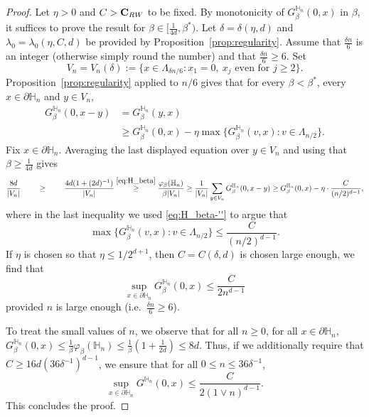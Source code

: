 \documentclass[11pt,a4paper]{article}
\numberwithin{equation}{section}
\theoremstyle{plain}
\theoremstyle{definition}
\newcommand\bfC{\mathbf{C}}
\begin{document}
\begin{proof} Let $\eta>0$ and $C>\bfC_{\rm RW}$ to be fixed. By monotonicity of $G_{\beta}^{\mathbb H_n}(0,x)$ in $\beta$, it suffices to prove the result for $\beta\in [\tfrac{1}{4d},\beta^*)$. Let $\delta=\delta(\eta,d)$ and $\lambda_0=\lambda_0(\eta,C,d)$ be provided by Proposition~\ref{prop:regularity}. Assume that $\tfrac{\delta n}{6}$ is an integer (otherwise simply round the number) and that $\tfrac{\delta n}{6}\geq 6$. Set \begin{equation}
V_n=V_n(\delta):=\Big\{x\in\Lambda_{\delta n/6}:x_1=0,\:x_j\text{ even for }j\ge2\Big\}.
\end{equation} 
Proposition~\ref{prop:regularity} applied to $n/6$ gives that for every $\beta<\beta^*$, every $x\in \partial\mathbb H_n$ and $y\in V_n$,
\begin{align}\label{eq:h1}
G_{\beta}^{\mathbb H_n}(0,x-y)&=G_{\beta}^{\mathbb H_n}(y,x)\\
&\ge G_{\beta}^{\mathbb H_n}(0,x)-\eta\max\{G_{\beta}^{\mathbb H_n}(v,x):v\in\Lambda_{n/2}\}.
\end{align}
Fix $x\in \partial \mathbb H_n$. Averaging the last displayed equation over $y\in V_n$ and using that $\beta\ge \tfrac1{4d}$ gives
\begin{align}\label{eq:h2}
\frac{8d}{|V_n|}\stackrel{\phantom{\eqref{eq:H_beta}}}\geq\frac{4d(1+(2d)^{-1})}{|V_n|}\stackrel{\eqref{eq:H_beta}}\ge \frac{\varphi_{\beta}(\mathbb H_n)}{\beta{|V_n|}}\geq \frac{1}{|V_n|}\sum_{y\in V_n}G_{\beta}^{\mathbb H_n}(0,x-y)\ge G_{\beta}^{\mathbb H_n}(0,x)-\eta\cdot \frac{C}{(n/2)^{d-1}},
\end{align}
where in the last inequality we used \eqref{eq:H_beta-''} to argue that
\begin{equation}
	\max\{G_{\beta}^{\mathbb H_n}(v,x):v\in\Lambda_{n/2}\}\leq \frac{C}{(n/2)^{d-1}}.
\end{equation}
If $\eta$ is chosen so that $\eta\le 1/2^{d+1}$, then $C=C(\delta,d)$ is chosen large enough, we find that
\begin{equation}
\sup_{x\in \partial\mathbb H_n}G_{\beta}^{\mathbb H_n}(0,x)\leq\frac{C}{2n^{d-1}}
\end{equation}
provided $n$ is large enough (i.e.\ $\tfrac{\delta n}{6}\geq 6$). 

To treat the small values of $n$, we observe that for all $n\geq 0$, for all $x\in \partial \mathbb H_n$, $G_\beta^{\mathbb H_n}(0,x)\le \tfrac{1}{\beta}\varphi_\beta(\mathbb H_n)\le \tfrac{1}{\beta}(1+\tfrac{1}{2d})\leq 8d$. Thus, if we additionally require that $C\geq 16d(36\delta^{-1})^{d-1}$, we ensure that for all $0\leq n\leq 36\delta^{-1}$,
\begin{equation}
	\sup_{x\in \partial\mathbb H_n}G^{\mathbb H_n}(0,x)\leq \frac{C}{2(1\vee n)^{d-1}}.
\end{equation}
This concludes the proof.
\end{proof}
\end{document}
